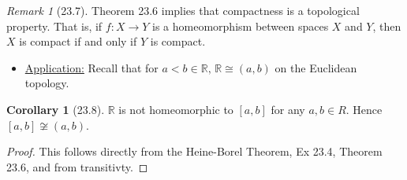 \documentclass{article}
\newcommand{\R}{\ensuremath{\mathbb{R}}}
\newcommand{\Iff}{if and only if}
\newcommand{\func}[3]{\ensuremath{#1: #2 \to #3}}
\newcommand{\homeo}{\cong}
\theoremstyle{definition}
\newtheorem*{cor}{Corollary}
\theoremstyle{remark}
\newtheorem*{rmk}{Remark}
\begin{document}
{{            \begin{rmk}[23.7]
                Theorem 23.6 implies that compactness is a topological property. That is, if $\func{f}{X}{Y}$ is a homeomorphism between spaces $X$ and $Y$, then $X$ is compact \Iff{} $Y$ is compact.
            \end{rmk}
            
            \begin{itemize}
                \item \underline{Application:} Recall that for $a<b\in\R, \, \R \homeo (a,b)$ on the Euclidean topology.
            \end{itemize}
            
            \begin{cor}[23.8]
                $\R$ is not homeomorphic to $[a,b]$ for any $a,b\in R$. Hence $[a,b] \not\homeo (a,b)$.
            \end{cor}
            
            \begin{proof}
                This follows directly from the Heine-Borel Theorem, Ex 23.4, Theorem 23.6, and from transitivty.
            \end{proof}
        }
    }
\end{document}
